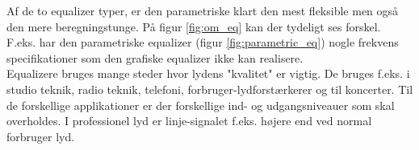 Af de to equalizer typer, er den parametriske klart den mest fleksible men også den mere beregningstunge. På figur \ref{fig:om_eq} kan der tydeligt ses forskel. F.eks. har den parametriske equalizer (figur \ref{fig:parametric_eq}) nogle frekvens specifikationer som den grafiske equalizer ikke kan realisere.\\

Equalizere bruges mange steder hvor lydens "kvalitet" er vigtig. 
De bruges f.eks. i studio teknik, radio teknik, telefoni, forbruger-lydforstærkerer og til koncerter. 
Til de forskellige applikationer er der forskellige ind- og udgangsniveauer som skal overholdes. 
I professionel lyd er linje-signalet f.eks. højere end ved normal forbruger lyd. 